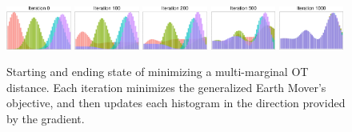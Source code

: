 \begin{figure}[t]
    \centering
    \includegraphics[width=0.19\textwidth]{6_demd/figs/hists/hists_iter_0.pdf}
    \includegraphics[width=0.19\textwidth]{6_demd/figs/hists/hists_iter_100.pdf}
    \includegraphics[width=0.19\textwidth]{6_demd/figs/hists/hists_iter_200.pdf}
    \includegraphics[width=0.19\textwidth]{6_demd/figs/hists/hists_iter_500.pdf}
    \includegraphics[width=0.19\textwidth]{6_demd/figs/hists/hists_iter_1000.pdf}
    \caption[Minimizing the generalized Earth Mover's Distance]{Starting and ending state of minimizing a multi-marginal OT distance. Each iteration minimizes the generalized Earth Mover's objective, and then updates each histogram in the direction provided by the gradient.}
    \label{fig:hists}
\end{figure}

